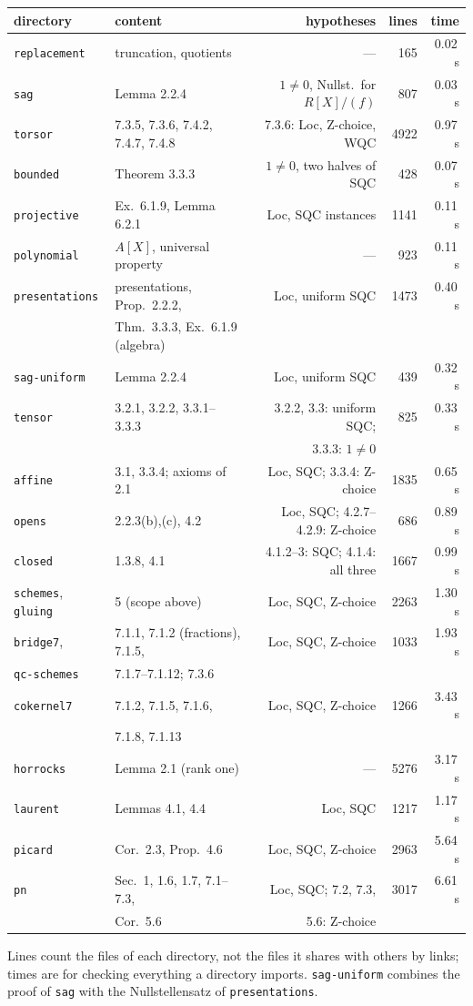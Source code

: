 \documentclass[11pt]{article}
\newcommand{\kw}[1]{\texttt{#1}}
\theoremstyle{remark}
\begin{document}
\begin{center}\small
\begin{tabular}{llrrr}
directory & content & hypotheses & lines & time\\\hline
\kw{replacement} & truncation, quotients & --- & 165 & 0.02\,s\\
\kw{sag} & Lemma 2.2.4 & $1\ne0$, Nullst.\ for $R[X]/(f)$ & 807 & 0.03\,s\\
\kw{torsor} & 7.3.5, 7.3.6, 7.4.2, 7.4.7, 7.4.8 & 7.3.6: Loc, Z-choice, WQC & 4922 & 0.97\,s\\
\kw{bounded} & Theorem 3.3.3 & $1\ne0$, two halves of SQC & 428 & 0.07\,s\\
\kw{projective} & Ex.~6.1.9, Lemma 6.2.1 & Loc, SQC instances & 1141 & 0.11\,s\\
\kw{polynomial} & $A[X]$, universal property & --- & 923 & 0.11\,s\\
\kw{presentations} & presentations, Prop.~2.2.2, & Loc, uniform SQC & 1473 & 0.40\,s\\
 & Thm.~3.3.3, Ex.~6.1.9 (algebra) & & & \\
\kw{sag-uniform} & Lemma 2.2.4 & Loc, uniform SQC & 439 & 0.32\,s\\
\kw{tensor} & 3.2.1, 3.2.2, 3.3.1--3.3.3 & 3.2.2, 3.3: uniform SQC; & 825 & 0.33\,s\\
 & & 3.3.3: $1\ne0$ & & \\
\kw{affine} & 3.1, 3.3.4; axioms of 2.1 & Loc, SQC; 3.3.4: Z-choice & 1835 & 0.65\,s\\
\kw{opens} & 2.2.3(b),(c), 4.2 & Loc, SQC; 4.2.7--4.2.9: Z-choice & 686 & 0.89\,s\\
\kw{closed} & 1.3.8, 4.1 & 4.1.2--3: SQC; 4.1.4: all three & 1667 & 0.99\,s\\
\kw{schemes}, \kw{gluing} & 5 (scope above) & Loc, SQC, Z-choice & 2263 & 1.30\,s\\
\kw{bridge7}, & 7.1.1, 7.1.2 (fractions), 7.1.5, & Loc, SQC, Z-choice & 1033 & 1.93\,s\\
\kw{qc-schemes} & 7.1.7--7.1.12; 7.3.6 & & & \\
\kw{cokernel7} & 7.1.2, 7.1.5, 7.1.6, & Loc, SQC, Z-choice & 1266 & 3.43\,s\\
 & 7.1.8, 7.1.13 & & & \\
\kw{horrocks} & \cite{Proj} Lemma 2.1 (rank one) & --- & 5276 & 3.17\,s\\
\kw{laurent} & \cite{Proj} Lemmas 4.1, 4.4 & Loc, SQC & 1217 & 1.17\,s\\
\kw{picard} & \cite{Proj} Cor.~2.3, Prop.~4.6 & Loc, SQC, Z-choice & 2963 & 5.64\,s\\
\kw{pn} & \cite{Proj} Sec.~1, 1.6, 1.7, 7.1--7.3, & Loc, SQC; 7.2, 7.3, & 3017 & 6.61\,s\\
 & Cor.~5.6 & 5.6: Z-choice & & \\
\end{tabular}
\end{center}
Lines count the files of each directory, not the files it shares with
others by links; times are for checking everything a directory imports.
\kw{sag-uniform} combines the proof of \kw{sag} with the
Nullstellensatz of \kw{presentations}.
\end{document}
